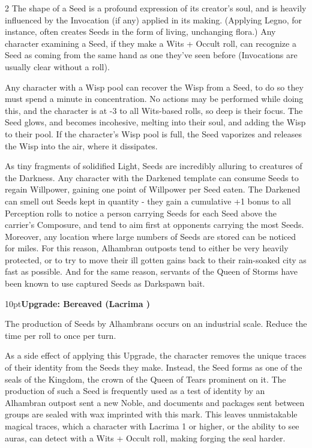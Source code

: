 \begin{multicols}{2}
The shape of a Seed is a profound expression of its creator's soul, and is heavily influenced by the Invocation (if any) applied in its making. (Applying Legno, for instance, often creates Seeds in the form of living, unchanging flora.) Any character examining a Seed, if they make a Wits + Occult roll, can recognize a Seed as coming from the same hand as one they've seen before (Invocations are usually clear without a roll). 

Any character with a Wisp pool can recover the Wisp from a Seed, to do so they must spend a minute in concentration. No actions may be performed while doing this, and the character is at -3 to all Wits-based rolls, so deep is their focus. The Seed glows, and becomes incohesive, melting into their soul, and adding the Wisp to their pool. If the character's Wisp pool is full, the Seed vaporizes and releases the Wisp into the air, where it dissipates.

As tiny fragments of solidified Light, Seeds are incredibly alluring to creatures of the Darkness. Any character with the Darkened template can consume Seeds to regain Willpower, gaining one point of Willpower per Seed eaten. The Darkened can smell out Seeds kept in quantity - they gain a cumulative +1 bonus to all Perception rolls to notice a person carrying Seeds for each Seed above the carrier's Composure, and tend to aim first at opponents carrying the most Seeds. Moreover, any location where large numbers of Seeds are stored can be noticed for miles. For this reason, Alhambran outposts tend to either be very heavily protected, or to try to move their ill gotten gains back to their rain-soaked city as fast as possible. And for the same reason, servants of the Queen of Storms have been known to use captured Seeds as Darkspawn bait.

\begin{myindentpar}{10pt}\textbf{Upgrade: Bereaved (Lacrima \textbullet\textbullet\textbullet)}

The production of Seeds by Alhambrans occurs on an industrial scale. Reduce the time per roll to once per turn. 

As a side effect of applying this Upgrade, the character removes the unique traces of their identity from the Seeds they make. Instead, the Seed forms as one of the seals of the Kingdom, the crown of the Queen of Tears prominent on it. The production of such a Seed is frequently used as a test of identity by an Alhambran outpost sent a new Noble, and documents and packages sent between groups are sealed with wax imprinted with this mark. This leaves unmistakable magical traces, which a character with Lacrima 1 or higher, or the ability to see auras, can detect with a Wits + Occult roll, making forging the seal harder.


\end{myindentpar}
\end{multicols}
